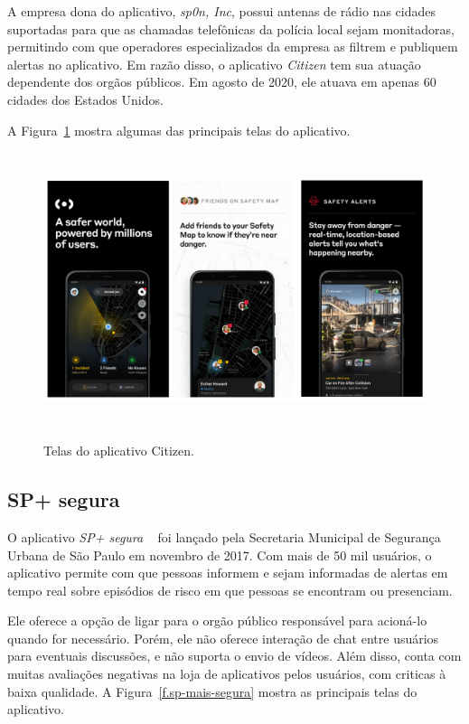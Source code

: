 A empresa dona do aplicativo, \emph{sp0n, Inc}, possui antenas de rádio nas cidades suportadas para que as chamadas telefônicas da polícia local sejam monitadoras, permitindo com que operadores especializados da empresa as filtrem e publiquem alertas no aplicativo. Em razão disso, o aplicativo \emph{Citizen} tem sua atuação dependente dos orgãos públicos. Em agosto de 2020, ele atuava em apenas 60 cidades dos Estados Unidos.

A Figura~\ref{f.citizen} mostra algumas das principais telas do aplicativo.

\begin{figure}[htbp]
	\caption{\small Telas do aplicativo Citizen.}
	\centering
	\includegraphics[height=8cm]{./images/citizen.png}
	\label{f.citizen}
\end{figure}

\FloatBarrier

\subsection{SP+ segura}

O aplicativo \emph{SP+ segura} ~\cite{sp-mais-segura} foi lançado pela Secretaria Municipal de Segurança Urbana de São Paulo em novembro de 2017. Com mais de 50 mil usuários, o aplicativo permite com que pessoas informem e sejam informadas de alertas em tempo real sobre episódios de risco em que pessoas se encontram ou presenciam. 

Ele oferece a opção de ligar para o orgão público responsável para acioná-lo quando for necessário. Porém, ele não oferece interação de chat entre usuários para eventuais discussões, e não suporta o envio de vídeos. Além disso, conta com muitas avaliações negativas na loja de aplicativos pelos usuários, com criticas à baixa qualidade. A Figura~\ref{f.sp-mais-segura} mostra as principais telas do aplicativo.


